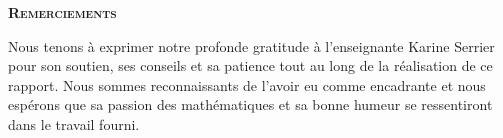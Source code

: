 \begin{frame}

\begin{center}
	\textsc{{\bf Remerciements}}
\end{center}

Nous tenons à exprimer notre profonde gratitude à l’enseignante Karine Serrier pour son soutien, ses conseils et sa patience tout au long de la réalisation de ce rapport. Nous sommes reconnaissants de l’avoir eu comme encadrante et nous espérons que sa passion des mathématiques et sa bonne humeur se ressentiront dans le travail fourni.

\end{frame}
